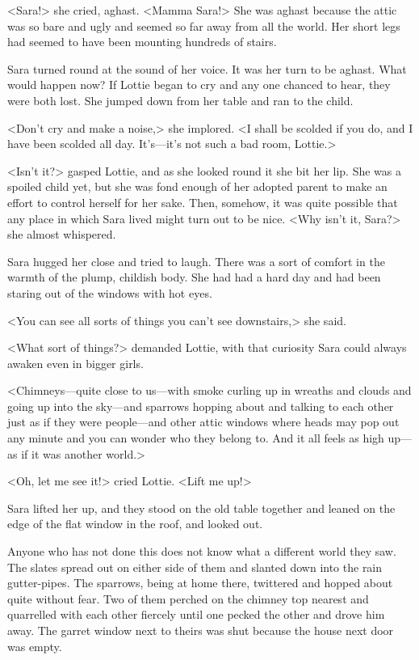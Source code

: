 <Sara!> she cried, aghast. <Mamma Sara!> She was aghast because the attic was so bare and ugly and seemed so far away from all the world. Her short legs had seemed to have been mounting hundreds of stairs.

Sara turned round at the sound of her voice. It was her turn to be aghast. What would happen now? If Lottie began to cry and any one chanced to hear, they were both lost. She jumped down from her table and ran to the child.

<Don't cry and make a noise,> she implored. <I shall be scolded if you do, and I have been scolded all day. It's—it's not such a bad room, Lottie.>

<Isn't it?> gasped Lottie, and as she looked round it she bit her lip. She was a spoiled child yet, but she was fond enough of her adopted parent to make an effort to control herself for her sake. Then, somehow, it was quite possible that any place in which Sara lived might turn out to be nice. <Why isn't it, Sara?> she almost whispered.

Sara hugged her close and tried to laugh. There was a sort of comfort in the warmth of the plump, childish body. She had had a hard day and had been staring out of the windows with hot eyes.

<You can see all sorts of things you can't see downstairs,> she said.

<What sort of things?> demanded Lottie, with that curiosity Sara could always awaken even in bigger girls.

<Chimneys—quite close to us—with smoke curling up in wreaths and clouds and going up into the sky—and sparrows hopping about and talking to each other just as if they were people—and other attic windows where heads may pop out any minute and you can wonder who they belong to. And it all feels as high up—as if it was another world.>

<Oh, let me see it!> cried Lottie. <Lift me up!>

Sara lifted her up, and they stood on the old table together and leaned on the edge of the flat window in the roof, and looked out.

Anyone who has not done this does not know what a different world they saw. The slates spread out on either side of them and slanted down into the rain gutter-pipes. The sparrows, being at home there, twittered and hopped about quite without fear. Two of them perched on the chimney top nearest and quarrelled with each other fiercely until one pecked the other and drove him away. The garret window next to theirs was shut because the house next door was empty.

